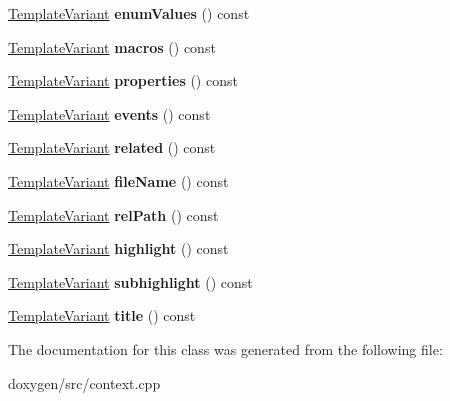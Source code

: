 \begin{DoxyCompactItemize}
\item 
\mbox{\label{class_globals_index_context_1_1_private_a1878be664e203f3669ef6adc7c49732d}} 
\mbox{\hyperlink{class_template_variant}{Template\+Variant}} {\bfseries enum\+Values} () const
\item 
\mbox{\label{class_globals_index_context_1_1_private_a84e52a5e7e129c5245373f613bb67779}} 
\mbox{\hyperlink{class_template_variant}{Template\+Variant}} {\bfseries macros} () const
\item 
\mbox{\label{class_globals_index_context_1_1_private_a5ebabf70400a8e689dce96be26446054}} 
\mbox{\hyperlink{class_template_variant}{Template\+Variant}} {\bfseries properties} () const
\item 
\mbox{\label{class_globals_index_context_1_1_private_a45ec5c157e21841a81a48be7f529b7bb}} 
\mbox{\hyperlink{class_template_variant}{Template\+Variant}} {\bfseries events} () const
\item 
\mbox{\label{class_globals_index_context_1_1_private_a260f14e710c4094887550b85c9b782b5}} 
\mbox{\hyperlink{class_template_variant}{Template\+Variant}} {\bfseries related} () const
\item 
\mbox{\label{class_globals_index_context_1_1_private_a5c0e695c4a49096cb9412439a168e4a4}} 
\mbox{\hyperlink{class_template_variant}{Template\+Variant}} {\bfseries file\+Name} () const
\item 
\mbox{\label{class_globals_index_context_1_1_private_a95c2a490200e6917622355686d355633}} 
\mbox{\hyperlink{class_template_variant}{Template\+Variant}} {\bfseries rel\+Path} () const
\item 
\mbox{\label{class_globals_index_context_1_1_private_aff0123e4f45e5398f49b9b33c59c7bf5}} 
\mbox{\hyperlink{class_template_variant}{Template\+Variant}} {\bfseries highlight} () const
\item 
\mbox{\label{class_globals_index_context_1_1_private_afde486129de11f5a3af9829f25522592}} 
\mbox{\hyperlink{class_template_variant}{Template\+Variant}} {\bfseries subhighlight} () const
\item 
\mbox{\label{class_globals_index_context_1_1_private_affb8a283c972e5330998d6a9b43fdff2}} 
\mbox{\hyperlink{class_template_variant}{Template\+Variant}} {\bfseries title} () const
\end{DoxyCompactItemize}


The documentation for this class was generated from the following file\+:\begin{DoxyCompactItemize}
\item 
doxygen/src/context.\+cpp\end{DoxyCompactItemize}
